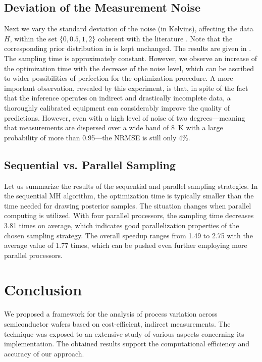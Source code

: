\subsection{Deviation of the Measurement Noise}

Next we vary the standard deviation of the noise (in Kelvins), affecting the
data $H$, within the set $\{ 0, 0.5, 1, 2 \}$ coherent with the literature
\cite{mesa-martinez2007}. Note that the corresponding prior distribution in
 is kept unchanged. The results are given in
. The sampling time is approximately constant. However, we
observe an increase of the optimization time with the decrease of the noise
level, which can be ascribed to wider possibilities of perfection for the
optimization procedure. A more important observation, revealed by this
experiment, is that, in spite of the fact that the inference operates on
indirect and drastically incomplete data, a thoroughly calibrated equipment can
considerably improve the quality of predictions. However, even with a high level
of noise of two degrees---meaning that measurements are dispersed over a wide
band of 8~K with a large probability of more than 0.95---the NRMSE is still only
4\%.

\subsection{Sequential vs. Parallel Sampling}

Let us summarize the results of the sequential and parallel sampling strategies.
In the sequential MH algorithm, the optimization time is typically smaller than
the time needed for drawing posterior samples. The situation changes when
parallel computing is utilized. With four parallel processors, the sampling time
decreases 3.81 times on average, which indicates good parallelization properties
of the chosen sampling strategy. The overall speedup ranges from 1.49 to 2.75
with the average value of 1.77 times, which can be pushed even further employing
more parallel processors.

\section{Conclusion}

We proposed a framework for the analysis of process variation across
semiconductor wafers based on cost-efficient, indirect measurements. The
technique was exposed to an extensive study of various aspects concerning its
implementation. The obtained results support the computational efficiency and
accuracy of our approach.

